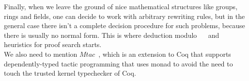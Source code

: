 Finally, when we leave the ground of nice mathematical structures like groups, rings and fields, one can decide to work with arbitrary rewriting rules, but in the general case there isn't a complete decision procedure for such problems, because there is usually no normal form. This is where deduction modulo~\cite{Dowek03} ~\cite{DelahayeModulo} and heuristics for proof search starts. \\

We also need to mention $Mtac$~\cite{Ziliani13}, which is an extension to Coq that supports dependently-typed tactic programming that uses monad to avoid the need to touch the trusted kernel typechecker of Coq.


